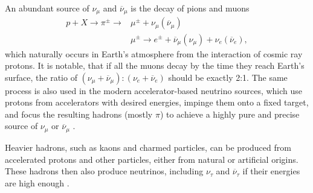 
An abundant source of $\nu_\mu$ and $\overline{\nu}_\mu$ is the decay of pions and muons
\begin{align}
p+X \rightarrow \pi^\pm \rightarrow &\mu^\pm + \nu_\mu\left(\overline{\nu}_\mu\right) \\
 & \mu^\pm \rightarrow e^\pm + \overline{\nu}_\mu\left(\nu_\mu\right) + \nu_e\left(\overline{\nu}_e\right),
\end{align}
which naturally occurs in Earth's atmosphere from the interaction of cosmic ray protons. It is notable, that if all the muons decay by the time they reach Earth's surface, the ratio of $\left(\nu_\mu+\overline{\nu}_\mu\right) : \left(\nu_e+\overline{\nu}_e\right)$ should be exactly 2:1. The same process is also used in the modern accelerator-based neutrino sources, which use protons from accelerators with desired energies, impinge them onto a fixed target, and focus the resulting hadrons (mostly $\pi$) to achieve a highly pure and precise source of $\nu_\mu$ or $\overline{\nu}_\mu$ \cite{GoodmanAdvancesInNeutrinoPhysics.pdf, SchwartzAccelerators.pdf}.

Heavier hadrons, such as kaons and charmed particles, can be produced from accelerated protons and other particles, either from natural or artificial origins. These hadrons then also produce neutrinos, including $\nu_\tau$ and $\overline{\nu}_\tau$ if their energies are high enough \cite{ObservationOfTauNeutrino.pdf, FinalTauNeutrinoResultsDONUT2008.pdf}.


